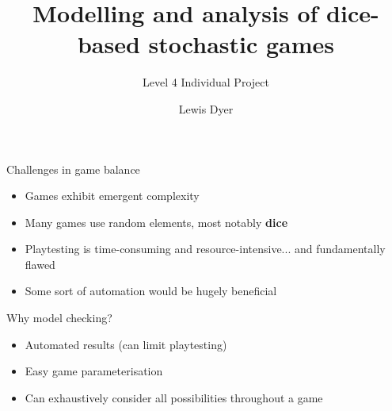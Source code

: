 \documentclass[10pt]{beamer}
\title{Modelling and analysis of dice-based stochastic games}
\subtitle{Level 4 Individual Project}
\date{}
\author{Lewis Dyer}
\institute{University of Glasgow}
\begin{document}
\maketitle

\begin{frame}{Challenges in game balance}
\begin{itemize}
\item Games exhibit \alert{emergent complexity}
\item Many games use random elements, most notably \textbf{dice}
\item Playtesting is time-consuming and resource-intensive... and fundamentally flawed
\item Some sort of automation would be hugely beneficial
\end{itemize}
\end{frame}




\begin{frame}{Why model checking?}
\begin{itemize}
    \item Automated results (can limit playtesting)
    \item Easy game parameterisation
    \item Can \alert{exhaustively consider all possibilities} throughout a game
\end{itemize}
\end{frame}
\end{document}
